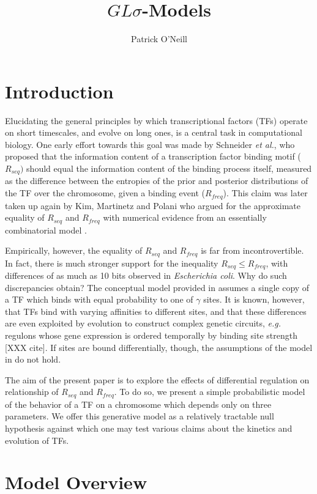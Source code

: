 \documentclass{article}
\title{$GL\sigma$-Models}
\author{Patrick O'Neill}
\begin{document}
\maketitle{}

\section{Introduction}
Elucidating the general principles by which transcriptional factors
(TFs) operate on short timescales, and evolve on long ones, is a
central task in computational biology.  One early effort towards this
goal was made by Schneider \textit{et al.}, who proposed that the
information content of a transcription factor binding motif ($R_{seq})
$ should equal the information content of the binding process itself,
measured as the difference between the entropies of the prior and
posterior distributions of the TF over the chromosome, given a binding
event ($R_{freq}$)\cite{schneider86}.  This claim was later taken up
again by Kim, Martinetz and Polani who argued for the approximate
equality of $R_{seq}$ and $R_{freq}$ with numerical evidence from an
essentially combinatorial model \cite{kim00}.

Empirically, however, the equality of $R_{seq}$ and $R_{freq}$ is far
from incontrovertible.  In fact, there is much stronger support for
the inequality $R_{seq} \leq R_{freq}$, with differences of as much as
10 bits observed in \textit{Escherichia coli}.  Why do such
discrepancies obtain?  The conceptual model provided in
\cite{schneider86} assumes a single copy of a TF which binds with
equal probability to one of $\gamma$ sites.  It is known, however,
that TFs bind with varying affinities to different sites, and that
these differences are even exploited by evolution to construct complex
genetic circuits, \textit{e.g.} regulons whose gene expression is
ordered temporally by binding site strength [XXX cite].  If sites are
bound differentially, though, the assumptions of the model in
\cite{schneider86} do not hold.

The aim of the present paper is to explore the effects of differential
regulation on relationship of $R_{seq}$ and $R_{freq}$.  To do so, we
present a simple probabilistic model of the behavior of a TF on a
chromosome which depends only on three parameters.  We offer this
generative model as a relatively tractable null hypothesis against
which one may test various claims about the kinetics and evolution of
TFs.

\section{Model Overview}
\end{document}
